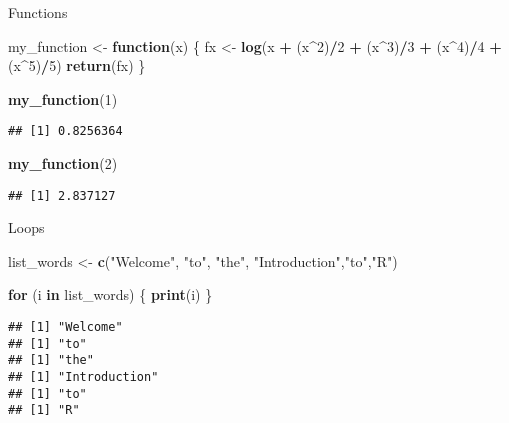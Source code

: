 \documentclass[]{article}
\newenvironment{Shaded}{\begin{snugshade}}{\end{snugshade}}
\newcommand{\KeywordTok}[1]{\textcolor[rgb]{0.13,0.29,0.53}{\textbf{#1}}}
\newcommand{\DecValTok}[1]{\textcolor[rgb]{0.00,0.00,0.81}{#1}}
\newcommand{\StringTok}[1]{\textcolor[rgb]{0.31,0.60,0.02}{#1}}
\newcommand{\ControlFlowTok}[1]{\textcolor[rgb]{0.13,0.29,0.53}{\textbf{#1}}}
\newcommand{\OperatorTok}[1]{\textcolor[rgb]{0.81,0.36,0.00}{\textbf{#1}}}
\newcommand{\NormalTok}[1]{#1}
\begin{document}
Functions

\begin{Shaded}
\begin{Highlighting}[]
\NormalTok{my_function <-}\StringTok{ }\ControlFlowTok{function}\NormalTok{(x) \{}
\NormalTok{        fx <-}\StringTok{ }\KeywordTok{log}\NormalTok{(x }\OperatorTok{+}\StringTok{ }\NormalTok{(x}\OperatorTok{^}\DecValTok{2}\NormalTok{)}\OperatorTok{/}\DecValTok{2} \OperatorTok{+}\StringTok{ }\NormalTok{(x}\OperatorTok{^}\DecValTok{3}\NormalTok{)}\OperatorTok{/}\DecValTok{3} \OperatorTok{+}\StringTok{ }\NormalTok{(x}\OperatorTok{^}\DecValTok{4}\NormalTok{)}\OperatorTok{/}\DecValTok{4} \OperatorTok{+}\StringTok{ }\NormalTok{(x}\OperatorTok{^}\DecValTok{5}\NormalTok{)}\OperatorTok{/}\DecValTok{5}\NormalTok{)}
        \KeywordTok{return}\NormalTok{(fx)}
\NormalTok{    \}}


\KeywordTok{my_function}\NormalTok{(}\DecValTok{1}\NormalTok{)}
\end{Highlighting}
\end{Shaded}

\begin{verbatim}
## [1] 0.8256364
\end{verbatim}

\begin{Shaded}
\begin{Highlighting}[]
\KeywordTok{my_function}\NormalTok{(}\DecValTok{2}\NormalTok{)}
\end{Highlighting}
\end{Shaded}

\begin{verbatim}
## [1] 2.837127
\end{verbatim}

Loops

\begin{Shaded}
\begin{Highlighting}[]
\NormalTok{list_words <-}\StringTok{ }\KeywordTok{c}\NormalTok{(}\StringTok{"Welcome"}\NormalTok{, }\StringTok{"to"}\NormalTok{, }\StringTok{"the"}\NormalTok{, }\StringTok{"Introduction"}\NormalTok{,}\StringTok{"to"}\NormalTok{,}\StringTok{"R"}\NormalTok{)}

\ControlFlowTok{for}\NormalTok{ (i }\ControlFlowTok{in}\NormalTok{ list_words) \{}
    \KeywordTok{print}\NormalTok{(i)}
\NormalTok{\}}
\end{Highlighting}
\end{Shaded}

\begin{verbatim}
## [1] "Welcome"
## [1] "to"
## [1] "the"
## [1] "Introduction"
## [1] "to"
## [1] "R"
\end{verbatim}
\end{document}
